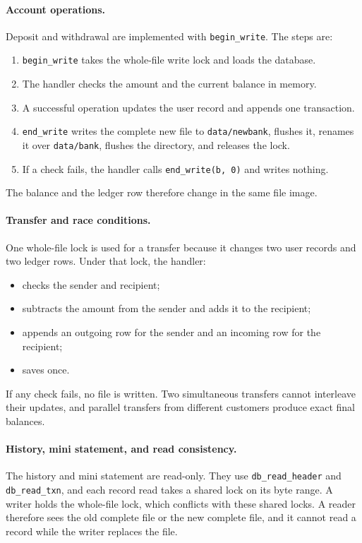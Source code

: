 \documentclass[11pt,a4paper]{article}
\begin{document}
\paragraph{Account operations.} Deposit and withdrawal are implemented with \texttt{begin\_write}. The steps are:
\begin{enumerate}
\item \texttt{begin\_write} takes the whole-file write lock and loads the database.
\item The handler checks the amount and the current balance in memory.
\item A successful operation updates the user record and appends one transaction.
\item \texttt{end\_write} writes the complete new file to \texttt{data/newbank}, flushes it, renames it over \texttt{data/bank}, flushes the directory, and releases the lock.
\item If a check fails, the handler calls \texttt{end\_write(b, 0)} and writes nothing.
\end{enumerate}
The balance and the ledger row therefore change in the same file image.

\paragraph{Transfer and race conditions.} One whole-file lock is used for a transfer because it changes two user records and two ledger rows. Under that lock, the handler:
\begin{itemize}
\item checks the sender and recipient;
\item subtracts the amount from the sender and adds it to the recipient;
\item appends an outgoing row for the sender and an incoming row for the recipient;
\item saves once.
\end{itemize}
If any check fails, no file is written. Two simultaneous transfers cannot interleave their updates, and parallel transfers from different customers produce exact final balances.

\paragraph{History, mini statement, and read consistency.} The history and mini statement are read-only. They use \texttt{db\_read\_header} and \texttt{db\_read\_txn}, and each record read takes a shared lock on its byte range. A writer holds the whole-file lock, which conflicts with these shared locks. A reader therefore sees the old complete file or the new complete file, and it cannot read a record while the writer replaces the file.
\end{document}
